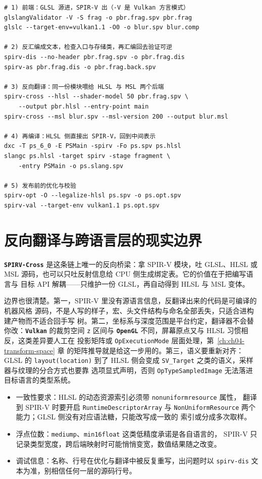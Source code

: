 \documentclass[12pt,a4paper,fontset=fandol]{ctexbook}
\newcommand{\Tp}[1]{\texttt{#1}}
\newcommand{\Bk}{\discretionary{}{}{}}
\newcommand{\Lib}[1]{\textbf{\texttt{#1}}}
\newcommand{\Lang}[1]{\textsf{#1}}
\newcommand{\DomCPU}{\Lang{CPU}}
\newcommand{\GSL}{\Lang{GLSL}}
\newcommand{\HSL}{\Lang{HLSL}}
\newcommand{\MSL}{\Lang{MSL}}
\newcommand{\SPIV}{\Lang{SPIR-V}}
\begin{document}
\begin{lstlisting}[style=shellstyle,caption={一次完整的往返：编译、反汇编、再翻译、再编译、优化与校验},label={lst:ch07-roundtrip}]
# 1) 前端：GLSL 源进，SPIR-V 出（-V 是 Vulkan 方言模式）
glslangValidator -V -S frag -o pbr.frag.spv pbr.frag
glslc --target-env=vulkan1.1 -O0 -o blur.spv blur.comp

# 2) 反汇编成文本，检查入口与存储类，再汇编回去验证可逆
spirv-dis --no-header pbr.frag.spv -o pbr.frag.dis
spirv-as pbr.frag.dis -o pbr.frag.back.spv

# 3) 反向翻译：同一份模块喂给 HLSL 与 MSL 两个后端
spirv-cross --hlsl --shader-model 50 pbr.frag.spv \
    --output pbr.hlsl --entry-point main
spirv-cross --msl blur.spv --msl-version 200 --output blur.msl

# 4) 再编译：HLSL 侧直接出 SPIR-V，回到中间表示
dxc -T ps_6_0 -E PSMain -spirv -Fo ps.spv ps.hlsl
slangc ps.hlsl -target spirv -stage fragment \
    -entry PSMain -o ps.slang.spv

# 5) 发布前的优化与校验
spirv-opt -O --legalize-hlsl ps.spv -o ps.opt.spv
spirv-val --target-env vulkan1.1 ps.opt.spv
\end{lstlisting}

\section{反向翻译与跨语言层的现实边界}

\Lib{SPIRV-Cross} 是这条链上唯一的反向桥梁：拿 \SPIV{} 模块，吐 \GSL{}、\HSL{} 或
\MSL{} 源码，也可以只吐反射信息给 \DomCPU{} 侧生成绑定表。它的价值在于把编写语言与
目标 API 解耦——只维护一份 \GSL{}，再自动得到 \HSL{} 与 \MSL{} 变体。

边界也很清楚。第一，\SPIV{} 里没有源语言信息，反翻译出来的代码是可编译的机器风格
源码，不是人写的样子，宏、头文件结构与命名全部丢失，只适合进构建产物而不适合回手写
树。第二，坐标系与深度范围是平台约定，翻译器不会替你改：\Lib{Vulkan} 的裁剪空间
\Tp{z} 区间与 \Lib{OpenGL} 不同，屏幕原点又与 \HSL{} 习惯相反，这类差异要人工在
投影矩阵或 \Tp{Op\Bk ExecutionMode} 层面处理，第~\ref{ch:ch04-transform-space} 章
的矩阵推导就是给这一步用的。第三，语义要重新对齐：\GSL{} 的 \Tp{layout(location)}
到了 \HSL{} 侧会变成 \Tp{SV\_Target} 之类的语义，采样器与纹理的分合方式也要靠
选项显式声明，否则 \Tp{Op\Bk Type\Bk SampledImage} 无法落进目标语言的类型系统。

\begin{warning}[title={跨语言层吞不掉的三件事}]
\begin{itemize}
\item 一致性要求：\HSL{} 的动态资源索引必须带 \Tp{nonuniform\Bk resource} 属性，
翻译到 \SPIV{} 时要开启 \Tp{Runtime\Bk DescriptorArray} 与
\Tp{NonUniform\Bk Resource} 两个能力；\GSL{} 侧没有对应语法糖，只能改写成一致的
索引或分成多次取样。
\item 浮点位数：\Tp{mediump}、\Tp{min16float} 这类低精度承诺是各自语言的，
\SPIV{} 只记录类型宽度，跨后端映射时可能悄悄变宽，数值结果随之改变。
\item 调试信息：名称、行号在优化与翻译中被反复重写，出问题时以
\Tp{spirv\Bk-dis} 文本为准，别相信任何一层的源码行号。
\end{itemize}
\end{warning}
\end{document}

